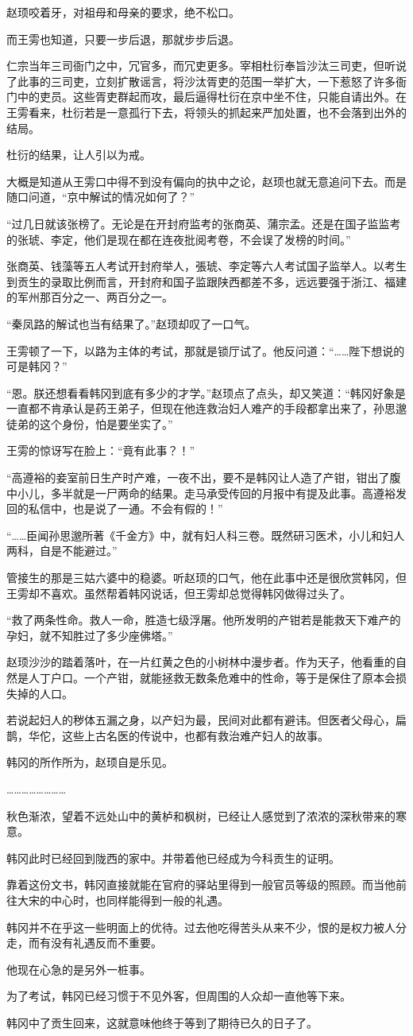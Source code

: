 赵顼咬着牙，对祖母和母亲的要求，绝不松口。

而王雱也知道，只要一步后退，那就步步后退。

仁宗当年三司衙门之中，冗官多，而冗吏更多。宰相杜衍奉旨沙汰三司吏，但听说了此事的三司吏，立刻扩散谣言，将沙汰胥吏的范围一举扩大，一下惹怒了许多衙门中的吏员。这些胥吏群起而攻，最后逼得杜衍在京中坐不住，只能自请出外。在王雱看来，杜衍若是一意孤行下去，将领头的抓起来严加处置，也不会落到出外的结局。

杜衍的结果，让人引以为戒。

大概是知道从王雱口中得不到没有偏向的执中之论，赵顼也就无意追问下去。而是随口问道，“京中解试的情况如何了？”

“过几日就该张榜了。无论是在开封府监考的张商英、蒲宗孟。还是在国子监监考的张琥、李定，他们是现在都在连夜批阅考卷，不会误了发榜的时间。”

张商英、钱藻等五人考试开封府举人，張琥、李定等六人考试国子监举人。以考生到贡生的录取比例而言，开封府和国子监跟陕西都差不多，远远要强于浙江、福建的军州那百分之一、两百分之一。

“秦凤路的解试也当有结果了。”赵顼却叹了一口气。

王雱顿了一下，以路为主体的考试，那就是锁厅试了。他反问道：“……陛下想说的可是韩冈？”

“恩。朕还想看看韩冈到底有多少的才学。”赵顼点了点头，却又笑道：“韩冈好象是一直都不肯承认是药王弟子，但现在他连救治妇人难产的手段都拿出来了，孙思邈徒弟的这个身份，怕是要坐实了。”

王雱的惊讶写在脸上：“竟有此事？！”

“高遵裕的妾室前日生产时产难，一夜不出，要不是韩冈让人造了产钳，钳出了腹中小儿，多半就是一尸两命的结果。走马承受传回的月报中有提及此事。高遵裕发回的私信中，也是说了一通。不会有假的！”

“……臣闻孙思邈所著《千金方》中，就有妇人科三卷。既然研习医术，小儿和妇人两科，自是不能避过。”

管接生的那是三姑六婆中的稳婆。听赵顼的口气，他在此事中还是很欣赏韩冈，但王雱却不喜欢。虽然帮着韩冈说话，但王雱却总觉得韩冈做得过头了。

“救了两条性命。救人一命，胜造七级浮屠。他所发明的产钳若是能救天下难产的孕妇，就不知胜过了多少座佛塔。”

赵顼沙沙的踏着落叶，在一片红黄之色的小树林中漫步者。作为天子，他看重的自然是人丁户口。一个产钳，就能拯救无数条危难中的性命，等于是保住了原本会损失掉的人口。

若说起妇人的秽体五漏之身，以产妇为最，民间对此都有避讳。但医者父母心，扁鹊，华佗，这些上古名医的传说中，也都有救治难产妇人的故事。

韩冈的所作所为，赵顼自是乐见。

……………………

秋色渐浓，望着不远处山中的黄栌和枫树，已经让人感觉到了浓浓的深秋带来的寒意。

韩冈此时已经回到陇西的家中。并带着他已经成为今科贡生的证明。

靠着这份文书，韩冈直接就能在官府的驿站里得到一般官员等级的照顾。而当他前往大宋的中心时，也同样能得到一般的礼遇。

韩冈并不在乎这一些明面上的优待。过去他吃得苦头从来不少，恨的是权力被人分走，而有没有礼遇反而不重要。

他现在心急的是另外一桩事。

为了考试，韩冈已经习惯于不见外客，但周围的人众却一直他等下来。

韩冈中了贡生回来，这就意味他终于等到了期待已久的日子了。

